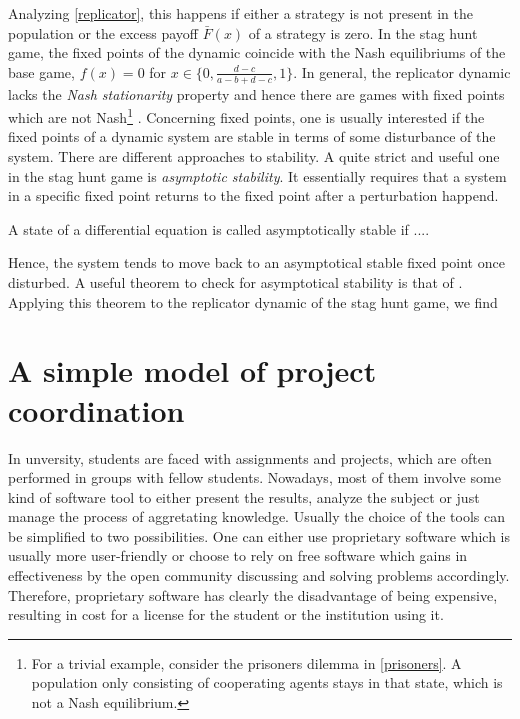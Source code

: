\documentclass[12pt]{article}
\begin{document}
Analyzing \eqref{replicator}, this happens if either a strategy
is not present in the population or the excess payoff $\bar{F}(x)$
of a strategy is zero. In the stag hunt game, the fixed points of the
dynamic coincide with the Nash equilibriums of the base game, $f(x) = 0$ for
$x \in \{0,\frac{d-c}{a-b+d-c},1\}$. In general, 
the replicator dynamic lacks the \textit{Nash stationarity} property
and hence there are games with fixed points which are not
Nash\footnote{For a trivial example, consider the prisoners dilemma in 
\ref{prisoners}. A population only consisting of cooperating agents stays in
that state, which is not a Nash equilibrium.} 
\parencite{sandholm_population_2010}.
Concerning fixed points, one is usually interested if the fixed points of 
a dynamic system are stable in terms of some disturbance of the system. 
There are different approaches to stability. A quite strict and useful one 
in the stag hunt game is \textit{asymptotic stability}. 
It essentially requires that a system in a specific fixed point returns 
to the fixed point after a perturbation happend.
\begin{mydef}
        A state of a differential equation is called asymptotically stable
        if ....
\end{mydef}
Hence, the system tends to move back to an asymptotical stable fixed point
once disturbed. 
A useful theorem to check for asymptotical stability is that 
of \cite{hartmanngrobman}. 
Applying this theorem to the replicator dynamic of the stag hunt game, we find
\section{A simple model of project coordination}
In unversity, students are faced with assignments and projects, which are 
often performed in groups with fellow students.
Nowadays, most of them involve some kind of 
software tool to either present the results, analyze the subject or just
manage the process of aggretating knowledge. Usually the choice of the tools
can be simplified to two possibilities.
One can either use proprietary software
which is usually more user-friendly or choose to rely on free software which
gains in effectiveness by the open community discussing and solving problems
accordingly. Therefore, proprietary software has clearly the disadvantage of
being expensive, resulting in cost for a license for the student or the
institution using it. 
\end{document}
